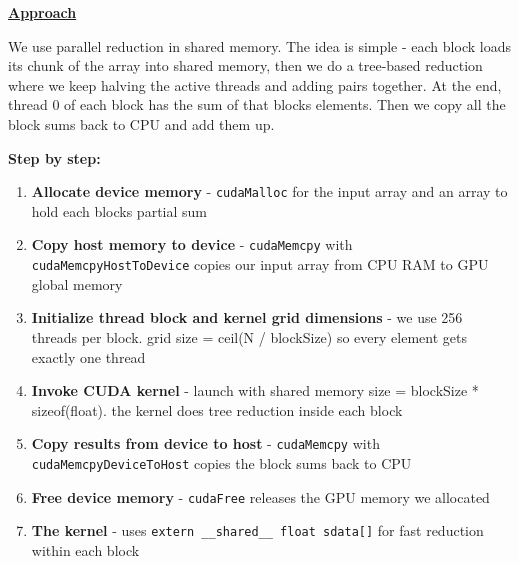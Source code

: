\documentclass[12pt]{article}
\begin{document}
\vspace{0.6cm}

\textbf{\Large \underline{Approach}}

\vspace{0.5cm}

We use parallel reduction in shared memory. The idea is simple - each block loads its chunk of the array into shared memory, then we do a tree-based reduction where we keep halving the active threads and adding pairs together. At the end, thread 0 of each block has the sum of that blocks elements. Then we copy all the block sums back to CPU and add them up.

\vspace{0.5cm}

\textbf{Step by step:}

\begin{enumerate}
\item \textbf{Allocate device memory} - \texttt{cudaMalloc} for the input array and an array to hold each blocks partial sum

\item \textbf{Copy host memory to device} - \texttt{cudaMemcpy} with \texttt{cudaMemcpyHostToDevice} copies our input array from CPU RAM to GPU global memory

\item \textbf{Initialize thread block and kernel grid dimensions} - we use 256 threads per block. grid size = ceil(N / blockSize) so every element gets exactly one thread

\item \textbf{Invoke CUDA kernel} - launch with shared memory size = blockSize * sizeof(float). the kernel does tree reduction inside each block

\item \textbf{Copy results from device to host} - \texttt{cudaMemcpy} with \texttt{cudaMemcpyDeviceToHost} copies the block sums back to CPU

\item \textbf{Free device memory} - \texttt{cudaFree} releases the GPU memory we allocated

\item \textbf{The kernel} - uses \texttt{extern \_\_shared\_\_ float sdata[]} for fast reduction within each block
\end{enumerate}

\vspace{0.5cm}

\vspace{0.7cm}
\end{document}
